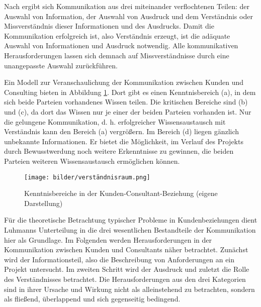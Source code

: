 \documentclass[../main.tex]{subfiles}
\begin{document}
Nach \textcite{luhmann1992communication} ergibt sich Kommunikation aus drei miteinander verflochtenen Teilen: der Auswahl von Information, der Auswahl von Ausdruck und dem Verständnis oder Missverständnis dieser Informationen und des Ausdrucks.
Damit die Kommunikation erfolgreich ist, also Verständnis erzeugt, ist die adäquate Auswahl von Informationen und Ausdruck notwendig.
Alle kommunikativen Herausforderungen lassen sich demnach auf Missverständnisse durch eine unangepasste Auswahl zurückführen.

Ein Modell zur Veranschaulichung der Kommunikation zwischen Kunden und Consulting bieten \textcite{davis2006communication} in Abbildung \ref{fig:kenntnisbereich}.
Dort gibt es einen Kenntnisbereich (a), in dem sich beide Parteien vorhandenes Wissen teilen.
Die kritischen Bereiche sind (b) und (c), da dort das Wissen nur je einer der beiden Parteien vorhanden ist.
Nur die gelungene Kommunikation, d. h. erfolgreicher Wissensaustausch mit Verständnis kann den Bereich (a) vergrößern. 
Im Bereich (d) liegen gänzlich unbekannte Informationen. 
Er bietet die Möglichkeit, im Verlauf des Projekts durch Bewusstwerdung noch weitere Erkenntnisse zu gewinnen, die beiden Parteien weiteren Wissensaustausch ermöglichen können. 

\begin{figure}[H]
    \centering
    \texttt{[image: bilder/verständnisraum.png]}
    \caption{Kenntnisbereiche in der Kunden-Consultant-Beziehung (eigene Darstellung)}
    \label{fig:kenntnisbereich}
\end{figure}

Für die theoretische Betrachtung typischer Probleme in Kundenbeziehungen dient Luhmanns Unterteilung in die drei wesentlichen Bestandteile der Kommunikation hier als Grundlage.
Im Folgenden werden Herausforderungen in der Kommunikation zwischen Kunden und Consultants näher betrachtet. 
Zunächst wird der Informationsteil, also die Beschreibung von Anforderungen an ein Projekt untersucht. 
Im zweiten Schritt wird der Ausdruck und zuletzt die Rolle des Verständnisses betrachtet. 
Die Herausforderungen aus den drei Kategorien sind in ihrer Ursache und Wirkung nicht als alleinstehend zu betrachten, sondern als fließend, überlappend und sich gegenseitig bedingend.
\end{document}
